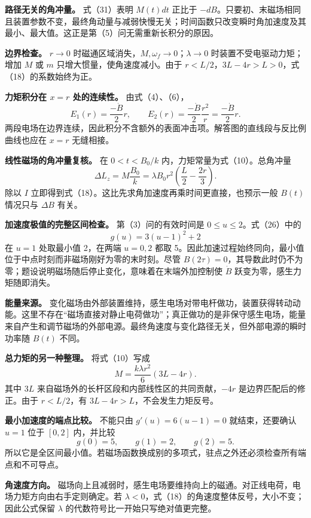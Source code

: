 \documentclass[12pt,a4paper,UTF8]{ctexart}
\begin{document}
\textbf{路径无关的角冲量。} 式（31）表明 \(M(t)dt\) 正比于
\(-dB\)。只要初、末磁场相同且装置参数不变，最终角动量与减弱快慢无关；时间函数只改变瞬时角加速度及其最小、最大值。这正是第（5）问无需重新长积分的原因。

\textbf{边界检查。} \(r\to0\)
时磁通区域消失，\(M,\omega_f\to0\)；\(\lambda\to0\)
时装置不受电驱动力矩；增加 \(M\) 或 \(m\) 只增大惯量，使角速度减小。由于
\(r<L/2\)，\(3L-4r>L>0\)，式（18）的系数始终为正。

\textbf{力矩积分在 \(x=r\) 处的连续性。} 由式（4）、（6）， \[
E_1(r)=\frac{-\dot B}{2}r,
\qquad
E_2(r)=\frac{-\dot B}{2}\frac{r^2}{r}
=\frac{-\dot B}{2}r. \tag{34}
\]
两段电场在边界连续，因此积分不含额外的表面冲击项。解答图的直线段与反比例曲线也应在
\(x=r\) 无缝相接。

\textbf{线性磁场的角冲量复核。} 在 \(0<t<B_0/k\)
内，力矩常量为式（10）。总角冲量 \[
\Delta L_z=M\frac{B_0}{k}
=\lambda B_0r^2\left(\frac L2-\frac{2r}{3}\right). \tag{35}
\] 除以 \(I\)
立即得到式（18）。这比先求角加速度再乘时间更直接，也预示一般 \(B(t)\)
情况只与 \(\Delta B\) 有关。

\textbf{加速度极值的完整区间检查。} 第（3）问的有效时间是
\(0\le u\le2\)。式（26）中的 \[
g(u)=3(u-1)^2+2 \tag{36}
\] 在 \(u=1\) 处取最小值 2，在两端 \(u=0,2\) 都取
5。因此加速过程始终同向，最小值位于中点时刻而非磁场刚好为零的末时刻。尽管
\(B(2\tau)=0\)，其导数此时仍不为零；题设说明磁场随后停止变化，意味着在末端外加控制使
\(\dot B\) 跃变为零，感生力矩随即消失。

\textbf{能量来源。}
变化磁场由外部装置维持，感生电场对带电杆做功，装置获得转动动能。这里不存在``磁场直接对静止电荷做功''；真正做功的是非保守感生电场，能量来自产生和调节磁场的外部电源。最终角速度与变化路径无关，但外部电源的瞬时功率随
\(B(t)\) 不同。

\textbf{总力矩的另一种整理。} 将式（10）写成 \[
M=\frac{k\lambda r^2}{6}(3L-4r). \tag{37}
\] 其中 \(3L\) 来自磁场外的长杆区段和内部线性区的共同贡献，\(-4r\)
是边界匹配后的修正。由于 \(r<L/2\)，有 \(3L-4r>L\)，不会发生力矩反号。

\textbf{最小加速度的端点比较。} 不能只由 \(g'(u)=6(u-1)=0\)
就结束，还要确认 \(u=1\) 位于 \([0,2]\) 内，并比较 \[
g(0)=5,
\qquad g(1)=2,
\qquad g(2)=5. \tag{38}
\]
所以它是全区间最小值。若磁场函数换成别的多项式，驻点之外还必须检查所有端点和不可导点。

\textbf{角速度方向。}
磁场向上且减弱时，感生电场要维持向上的磁通。对正线电荷，电场力矩方向由右手定则确定。若
\(\lambda<0\)，式（18）的角速度整体反号，大小不变；因此公式保留
\(\lambda\) 的代数符号比一开始只写绝对值更完整。
\end{document}
